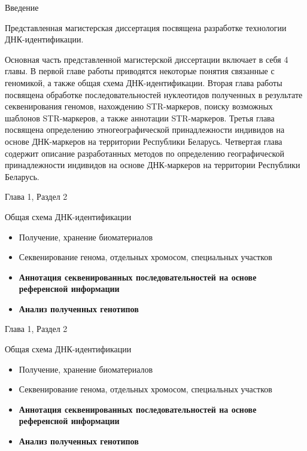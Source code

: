 \documentclass[8pt]{beamer}
\begin{document}
\begin{frame}{Введение}
    \begin{block}{Представленная магистерская диссертация посвящена разработке технологии ДНК-идентификации.}
    \end{block}

    \begin{block}{}
        Основная часть представленной магистерской диссертации включает в себя 4 главы.
        В первой главе работы приводятся некоторые понятия связанные с геномикой,
        а также общая схема ДНК-идентификации.
        Вторая глава работы посвящена обработке последовательностей нуклеотидов полученных в результате
        секвенирования геномов, нахождению STR-маркеров, поиску возможных шаблонов STR-маркеров,
        а также аннотации STR-маркеров.
        Третья глава посвящена определению этногеографической принадлежности индивидов на основе ДНК-маркеров на территории Республики Беларусь.
        Четвертая глава содержит описание разработанных методов по определению географической принадлежности индивидов на основе ДНК-маркеров на территории Республики Беларусь.
    \end{block}
\end{frame}

\begin{frame}{Глава 1, Раздел 2}
    \begin{block}{Общая схема ДНК-идентификации}
        \begin{itemize}
            \item Получение, хранение биоматериалов
            \item Секвенирование генома, отдельных хромосом, специальных участков
            \item \textbf{Аннотация секвенированных последовательностей на основе референсной информации}
            \item \textbf{Анализ полученных генотипов}
        \end{itemize}
    \end{block}
\end{frame}


\begin{frame}{Глава 1, Раздел 2}
    \begin{block}{Общая схема ДНК-идентификации}
        \begin{itemize}
            \item Получение, хранение биоматериалов
            \item Секвенирование генома, отдельных хромосом, специальных участков
            \item \textbf{Аннотация секвенированных последовательностей на основе референсной информации}
            \item \textbf{Анализ полученных генотипов}
        \end{itemize}
    \end{block}
\end{frame}
\end{document}
